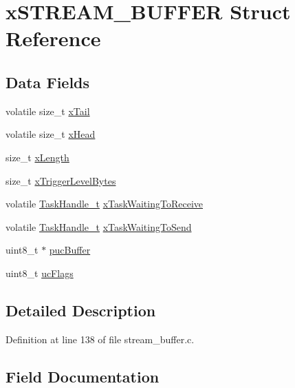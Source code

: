 \hypertarget{structx_s_t_r_e_a_m___b_u_f_f_e_r}{}\section{x\+S\+T\+R\+E\+A\+M\+\_\+\+B\+U\+F\+F\+ER Struct Reference}
\label{structx_s_t_r_e_a_m___b_u_f_f_e_r}
\subsection*{Data Fields}
\begin{DoxyCompactItemize}
\item 
volatile size\+\_\+t \hyperlink{structx_s_t_r_e_a_m___b_u_f_f_e_r_add6a93984bef69eda74c3779c15d3295}{x\+Tail}
\item 
volatile size\+\_\+t \hyperlink{structx_s_t_r_e_a_m___b_u_f_f_e_r_a6fbdda3881a3bbcd6ad366a484526971}{x\+Head}
\item 
size\+\_\+t \hyperlink{structx_s_t_r_e_a_m___b_u_f_f_e_r_ae3986d655d5138bf1674eb5d57ee16ce}{x\+Length}
\item 
size\+\_\+t \hyperlink{structx_s_t_r_e_a_m___b_u_f_f_e_r_ac2d391ae2521c8c94b4e0d12802dc34b}{x\+Trigger\+Level\+Bytes}
\item 
volatile \hyperlink{task_8h_ae95f44d4cfeb4a599c6cc258d241cb6b}{Task\+Handle\+\_\+t} \hyperlink{structx_s_t_r_e_a_m___b_u_f_f_e_r_a4c61e9654f24ac44aa7d3dd7dd02fe3d}{x\+Task\+Waiting\+To\+Receive}
\item 
volatile \hyperlink{task_8h_ae95f44d4cfeb4a599c6cc258d241cb6b}{Task\+Handle\+\_\+t} \hyperlink{structx_s_t_r_e_a_m___b_u_f_f_e_r_ada5585399db1983037386f271d9d45ae}{x\+Task\+Waiting\+To\+Send}
\item 
uint8\+\_\+t $\ast$ \hyperlink{structx_s_t_r_e_a_m___b_u_f_f_e_r_ae78920608012552e97bd903bd1193b16}{puc\+Buffer}
\item 
uint8\+\_\+t \hyperlink{structx_s_t_r_e_a_m___b_u_f_f_e_r_a0f8f79237cbab1b4c803675e49557efe}{uc\+Flags}
\end{DoxyCompactItemize}


\subsection{Detailed Description}


Definition at line 138 of file stream\+\_\+buffer.\+c.



\subsection{Field Documentation}
\mbox{\label{structx_s_t_r_e_a_m___b_u_f_f_e_r_ae78920608012552e97bd903bd1193b16}} 
